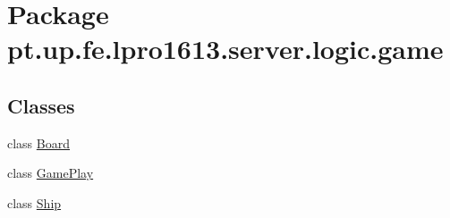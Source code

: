 \hypertarget{namespacept_1_1up_1_1fe_1_1lpro1613_1_1server_1_1logic_1_1game}{}\section{Package pt.\+up.\+fe.\+lpro1613.\+server.\+logic.\+game}
\label{namespacept_1_1up_1_1fe_1_1lpro1613_1_1server_1_1logic_1_1game}
\subsection*{Classes}
\begin{DoxyCompactItemize}
\item 
class \hyperlink{classpt_1_1up_1_1fe_1_1lpro1613_1_1server_1_1logic_1_1game_1_1_board}{Board}
\item 
class \hyperlink{classpt_1_1up_1_1fe_1_1lpro1613_1_1server_1_1logic_1_1game_1_1_game_play}{Game\+Play}
\item 
class \hyperlink{classpt_1_1up_1_1fe_1_1lpro1613_1_1server_1_1logic_1_1game_1_1_ship}{Ship}
\end{DoxyCompactItemize}
